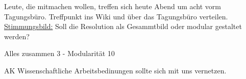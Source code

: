         Leute, die mitmachen wollen, treffen sich heute Abend um acht vorm Tagungsbüro. Treffpunkt ins Wiki und über das Tagungsbüro verteilen. \\
        \underline{Stimmungsbild:} Soll die Resolution als Gesammtbild oder modular gestaltet werden? \\
        \begin{center}
          Alles zusammen 3 - Modularität 10
        \end{center}

      AK Wissenschaftliche Arbeitsbedinungen sollte sich mit uns vernetzen.
